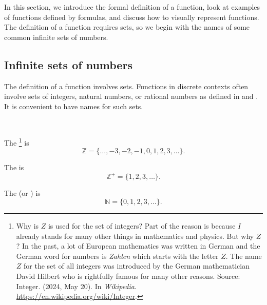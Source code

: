 \section{\secfunctions}
\label{sec_functions}

In this section, we introduce the formal definition of a function, look at examples of functions defined by formulas, and discuss how to visually represent functions.  The definition of a function requires sets, so we begin with the names of some common infinite sets of numbers.

\newcommand{\subinfsetsnumbers}{Infinite sets of numbers}
\subsection{\subinfsetsnumbers}
\label{sub_infinite_sets_numbers}

The definition of a function involves sets. Functions in discrete contexts often involve sets of integers, natural numbers, or rational numbers as defined in  and . It is convenient to have names for such sets.

\begin{defn}
\label{defn_sets_of_integers}  
~
    \begin{apart}
        \item The \footnote{Why is $Z$ is used for the set of integers? Part of the reason is because $I$ already stands for many other things in mathematics and physics. But why $Z$?  In the past, a lot of European mathematics was written in German and the German word for numbers is \emph{Zahlen} which starts with the letter $Z$.  The name $Z$ for the set of all integers was introduced by the German mathematician David Hilbert who is rightfully famous for many other reasons.  Source: Integer. (2024, May 20). In \emph{Wikipedia}. \url{https://en.wikipedia.org/wiki/Integer}.} 
        is $$\mathbb{Z} = \{ \ldots, -3,-2,-1,0,1,2,3,\ldots\}.$$   

        \item The  is $$\mathbb{Z}^+=\{1,2,3,\ldots\}.$$
        
        \item The  (or ) is
        $$\mathbb{N} = \{0, 1,2,3,\ldots\}.$$
    \end{apart}
\end{defn}

